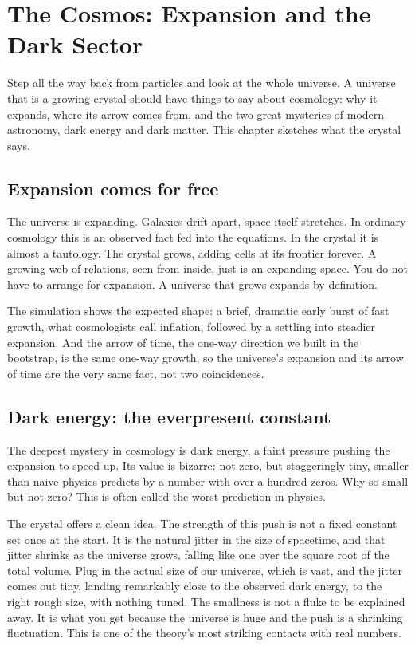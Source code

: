 \section{The Cosmos: Expansion and the Dark Sector}

Step all the way back from particles and look at the whole universe. A universe that is a growing crystal should have things to say about cosmology: why it expands, where its arrow comes from, and the two great mysteries of modern astronomy, dark energy and dark matter. This chapter sketches what the crystal says.

\subsection{Expansion comes for free}

The universe is expanding. Galaxies drift apart, space itself stretches. In ordinary cosmology this is an observed fact fed into the equations. In the crystal it is almost a tautology. The crystal grows, adding cells at its frontier forever. A growing web of relations, seen from inside, just is an expanding space. You do not have to arrange for expansion. A universe that grows expands by definition.

The simulation shows the expected shape: a brief, dramatic early burst of fast growth, what cosmologists call inflation, followed by a settling into steadier expansion. And the arrow of time, the one-way direction we built in the bootstrap, is the same one-way growth, so the universe's expansion and its arrow of time are the very same fact, not two coincidences.

\subsection{Dark energy: the everpresent constant}

The deepest mystery in cosmology is dark energy, a faint pressure pushing the expansion to speed up. Its value is bizarre: not zero, but staggeringly tiny, smaller than naive physics predicts by a number with over a hundred zeros. Why so small but not zero? This is often called the worst prediction in physics.

The crystal offers a clean idea. The strength of this push is not a fixed constant set once at the start. It is the natural jitter in the size of spacetime, and that jitter shrinks as the universe grows, falling like one over the square root of the total volume. Plug in the actual size of our universe, which is vast, and the jitter comes out tiny, landing remarkably close to the observed dark energy, to the right rough size, with nothing tuned. The smallness is not a fluke to be explained away. It is what you get because the universe is huge and the push is a shrinking fluctuation. This is one of the theory's most striking contacts with real numbers.


